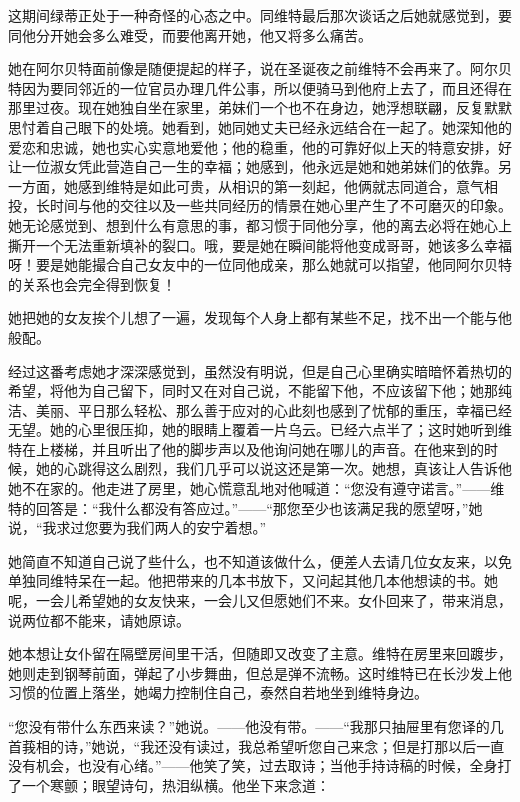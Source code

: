 \documentclass[12pt,oneside]{book}
\begin{document}
\begin{framed}
这期间绿蒂正处于一种奇怪的心态之中。同维特最后那次谈话之后她就感觉到，要同他分开她会多么难受，而要他离开她，他又将多么痛苦。

她在阿尔贝特面前像是随便提起的样子，说在圣诞夜之前维特不会再来了。阿尔贝特因为要同邻近的一位官员办理几件公事，所以便骑马到他府上去了，而且还得在那里过夜。现在她独自坐在家里，弟妹们一个也不在身边，她浮想联翩，反复默默思忖着自己眼下的处境。她看到，她同她丈夫已经永远结合在一起了。她深知他的爱恋和忠诚，她也实心实意地爱他；他的稳重，他的可靠好似上天的特意安排，好让一位淑女凭此营造自己一生的幸福；她感到，他永远是她和她弟妹们的依靠。另一方面，她感到维特是如此可贵，从相识的第一刻起，他俩就志同道合，意气相投，长时间与他的交往以及一些共同经历的情景在她心里产生了不可磨灭的印象。她无论感觉到、想到什么有意思的事，都习惯于同他分享，他的离去必将在她心上撕开一个无法重新填补的裂口。哦，要是她在瞬间能将他变成哥哥，她该多么幸福呀！要是她能撮合自己女友中的一位同他成亲，那么她就可以指望，他同阿尔贝特的关系也会完全得到恢复！

她把她的女友挨个儿想了一遍，发现每个人身上都有某些不足，找不出一个能与他般配。

经过这番考虑她才深深感觉到，虽然没有明说，但是自己心里确实暗暗怀着热切的希望，将他为自己留下，同时又在对自己说，不能留下他，不应该留下他；她那纯洁、美丽、平日那么轻松、那么善于应对的心此刻也感到了忧郁的重压，幸福已经无望。她的心里很压抑，她的眼睛上覆着一片乌云。已经六点半了；这时她听到维特在上楼梯，并且听出了他的脚步声以及他询问她在哪儿的声音。在他来到的时候，她的心跳得这么剧烈，我们几乎可以说这还是第一次。她想，真该让人告诉他她不在家的。他走进了房里，她心慌意乱地对他喊道：“您没有遵守诺言。”——维特的回答是：“我什么都没有答应过。”——“那您至少也该满足我的愿望呀，”她说，“我求过您要为我们两人的安宁着想。”

她简直不知道自己说了些什么，也不知道该做什么，便差人去请几位女友来，以免单独同维特呆在一起。他把带来的几本书放下，又问起其他几本他想读的书。她呢，一会儿希望她的女友快来，一会儿又但愿她们不来。女仆回来了，带来消息，说两位都不能来，请她原谅。

她本想让女仆留在隔壁房间里干活，但随即又改变了主意。维特在房里来回踱步，她则走到钢琴前面，弹起了小步舞曲，但总是弹不流畅。这时维特已在长沙发上他习惯的位置上落坐，她竭力控制住自己，泰然自若地坐到维特身边。

“您没有带什么东西来读？”她说。——他没有带。——“我那只抽屉里有您译的几首莪相的诗，”她说，“我还没有读过，我总希望听您自己来念；但是打那以后一直没有机会，也没有心绪。”——他笑了笑，过去取诗；当他手持诗稿的时候，全身打了一个寒颤；眼望诗句，热泪纵横。他坐下来念道：
\end{framed}
\end{document}
